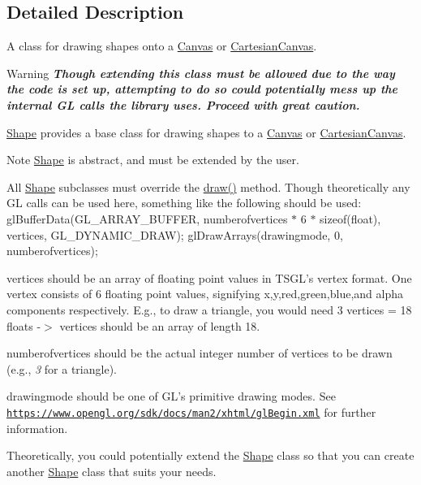 \subsection{Detailed Description}
A class for drawing shapes onto a \hyperlink{classtsgl_1_1_canvas}{Canvas} or \hyperlink{classtsgl_1_1_cartesian_canvas}{Cartesian\-Canvas}. 

\begin{DoxyWarning}{Warning}
{\bfseries {\itshape Though extending this class must be allowed due to the way the code is set up, attempting to do so could potentially mess up the internal G\-L calls the library uses. Proceed with great caution.}}
\end{DoxyWarning}
\hyperlink{classtsgl_1_1_shape}{Shape} provides a base class for drawing shapes to a \hyperlink{classtsgl_1_1_canvas}{Canvas} or \hyperlink{classtsgl_1_1_cartesian_canvas}{Cartesian\-Canvas}. \begin{DoxyNote}{Note}
\hyperlink{classtsgl_1_1_shape}{Shape} is abstract, and must be extended by the user.
\end{DoxyNote}
All \hyperlink{classtsgl_1_1_shape}{Shape} subclasses must override the \hyperlink{classtsgl_1_1_shape_af78b1627b97d621824ce86db214e2402}{draw()} method. Though theoretically any G\-L calls can be used here, something like the following should be used\-: {\ttfamily  gl\-Buffer\-Data(\-G\-L\-\_\-\-A\-R\-R\-A\-Y\-\_\-\-B\-U\-F\-F\-E\-R, numberofvertices $\ast$ 6 $\ast$ sizeof(float), vertices, G\-L\-\_\-\-D\-Y\-N\-A\-M\-I\-C\-\_\-\-D\-R\-A\-W); gl\-Draw\-Arrays(drawingmode, 0, numberofvertices); }

{\ttfamily vertices} should be an array of floating point values in T\-S\-G\-L's vertex format. One vertex consists of 6 floating point values, signifying x,y,red,green,blue,and alpha components respectively. E.\-g., to draw a triangle, you would need 3 vertices = 18 floats -\/$>$ vertices should be an array of length 18.

{\ttfamily numberofvertices} should be the actual integer number of vertices to be drawn (e.\-g., {\itshape 3} for a triangle).

{\ttfamily drawingmode} should be one of G\-L's primitive drawing modes. See \href{https://www.opengl.org/sdk/docs/man2/xhtml/glBegin.xml}{\tt https\-://www.\-opengl.\-org/sdk/docs/man2/xhtml/gl\-Begin.\-xml} for further information.

Theoretically, you could potentially extend the \hyperlink{classtsgl_1_1_shape}{Shape} class so that you can create another \hyperlink{classtsgl_1_1_shape}{Shape} class that suits your needs.

